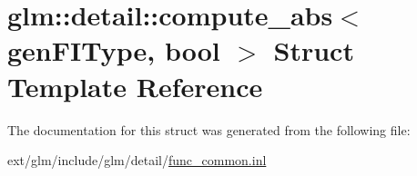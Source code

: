 \hypertarget{structglm_1_1detail_1_1compute__abs}{\section{glm\-:\-:detail\-:\-:compute\-\_\-abs$<$ gen\-F\-I\-Type, bool $>$ Struct Template Reference}
\label{structglm_1_1detail_1_1compute__abs}
}


The documentation for this struct was generated from the following file\-:\begin{DoxyCompactItemize}
\item 
ext/glm/include/glm/detail/\hyperlink{func__common_8inl}{func\-\_\-common.\-inl}\end{DoxyCompactItemize}
